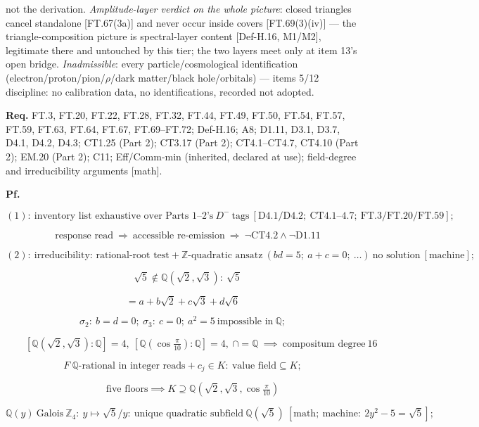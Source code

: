 \documentclass[11pt,openany]{report}
\theoremstyle{canonplain}
\theoremstyle{canondef}
\begin{document}
not the derivation. \textit{Amplitude-layer verdict on the whole picture}: closed triangles cancel standalone [FT.67(3a)] and never occur inside covers [FT.69(3)(iv)] — the triangle-composition picture is spectral-layer content [Def-H.16, M1/M2], legitimate there and untouched by this tier; the two layers meet only at item 13's open bridge. \textit{Inadmissible}: every particle/cosmological identification (electron/proton/pion/$\rho$/dark matter/black hole/orbitals) — items 5/12 discipline: no calibration data, no identifications, recorded not adopted.

\textbf{Req.} FT.3, FT.20, FT.22, FT.28, FT.32, FT.44, FT.49, FT.50, FT.54, FT.57, FT.59, FT.63, FT.64, FT.67, FT.69–FT.72; Def-H.16; A8; D1.11, D3.1, D3.7, D4.1, D4.2, D4.3; CT1.25 (Part 2); CT3.17 (Part 2); CT4.1–CT4.7, CT4.10 (Part 2); EM.20 (Part 2); C11; Eff/Comm-min (inherited, declared at use); field-degree and irreducibility arguments [math].

\textbf{Pf.}

\[
(1):\ \text{inventory list exhaustive over Parts 1–2's}\ D^-\ \text{tags}\ [\text{D4.1/D4.2};\ \mathrm{CT4.1\text{–}4.7};\ \mathrm{FT.3/FT.20/FT.59}];
\]

\[
\quad\text{response read}\ \Rightarrow\ \text{accessible re-emission}\ \Rightarrow\ \neg\mathrm{CT4.2}\wedge\neg\mathrm{D1.11}
\]

\[
(2):\ \text{irreducibility: rational-root test} + \mathbb Z\text{-quadratic ansatz}\ (bd{=}5;\ a{+}c{=}0;\ \ldots)\ \text{no solution}\ [\text{machine}];
\]

\[
\quad\sqrt5\notin\mathbb Q(\sqrt2,\sqrt3):\ \sqrt5
\]

\[
= a{+}b\sqrt2{+}c\sqrt3{+}d\sqrt6
\]

\[
\sigma_2:\ b{=}d{=}0;\ \sigma_3:\ c{=}0;\ a^2{=}5\ \text{impossible in}\ \mathbb Q;
\]

\[
\qquad [\mathbb Q(\sqrt2,\sqrt3):\mathbb Q]=4,\ [\mathbb Q(\cos\tfrac\pi{10}):\mathbb Q]=4,\ \cap=\mathbb Q\ \implies\ \text{compositum degree}\ 16
\]

\[
F\ \mathbb Q\text{-rational in integer reads} + c_j\in K:\ \text{value field}\subseteq K;
\]

\[
\qquad \text{five floors}\implies K\supseteq\mathbb Q(\sqrt2,\sqrt3,\cos\tfrac\pi{10})
\]

\[
\mathbb Q(y)\ \text{Galois}\ \mathbb Z_4:\ y\mapsto\sqrt5/y:\ \text{unique quadratic subfield}\ \mathbb Q(\sqrt5)\ [\text{math};\ \text{machine}:\ 2y^2-5=\sqrt5];
\]
\end{document}
